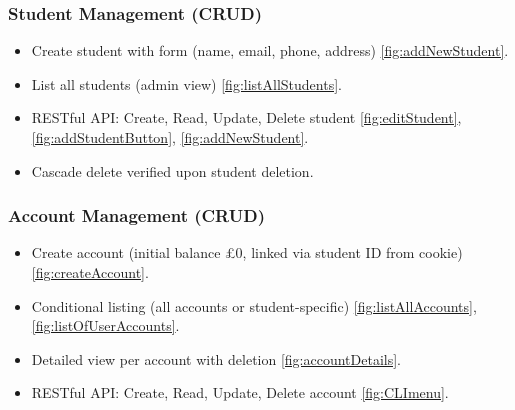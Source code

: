 \documentclass[12pt]{article}
\begin{document}
\begin{center}
\end{center}

\subsubsection{Student Management (CRUD)}

\begin{itemize}
	\item Create student with form (name, email, phone, address) \autoref{fig:addNewStudent}.
	\item List all students (admin view) \autoref{fig:listAllStudents}.
	\item RESTful API: Create, Read, Update, Delete student \autoref{fig:editStudent}, \autoref{fig:addStudentButton}, \autoref{fig:addNewStudent}.
	\item Cascade delete verified upon student deletion.
\end{itemize}

\begin{center}
\end{center}

\subsubsection{Account Management (CRUD)}

\begin{itemize}
	\item Create account (initial balance £0, linked via student ID from cookie) \autoref{fig:createAccount}.
	\item Conditional listing (all accounts or student-specific) \autoref{fig:listAllAccounts}, \autoref{fig:listOfUserAccounts}.
	\item Detailed view per account with deletion \autoref{fig:accountDetails}.
	\item RESTful API: Create, Read, Update, Delete account \autoref{fig:CLImenu}.
\end{itemize}

\begin{center}
\end{center}
\end{document}
